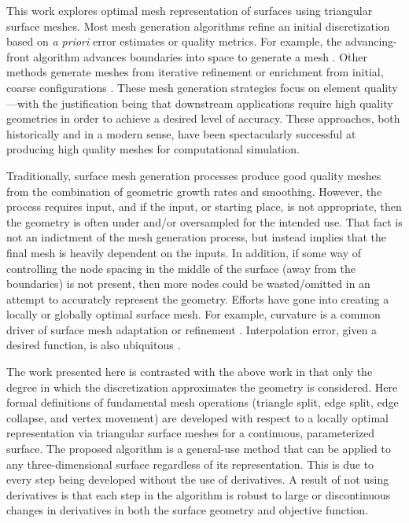 This work explores optimal mesh representation of surfaces using 
triangular surface meshes.
Most mesh generation algorithms refine an initial discretization based
on {\it a priori} error estimates or quality metrics. For example, the
advancing-front algorithm advances boundaries into space to generate a
mesh \cite{tristrano98,diaz-morcillo98}. Other methods generate
meshes from iterative refinement or enrichment from initial, coarse
configurations \cite{marcum98,marcum00,shewchuk02}. These mesh
generation strategies focus on element quality---with the
justification being that downstream applications require high quality
geometries in order to achieve a desired level of accuracy. These
approaches, both historically and in a modern sense, have been 
spectacularly successful at producing high quality meshes for 
computational simulation.

Traditionally, surface mesh generation processes produce good quality
meshes from the combination of geometric growth rates and smoothing.
However, the process requires input, and if the input, or starting place,
is not appropriate, then the geometry is often under and/or oversampled
for the intended use. That fact is not an indictment of the mesh
generation process, but instead implies that the final mesh is heavily
dependent on the inputs. In addition, if some way of controlling the
node spacing in the middle of the surface (away from the boundaries) is
not present, then more nodes could be wasted/omitted in an attempt to
accurately represent the geometry. Efforts have gone into
creating a locally or globally optimal surface mesh. For example,
curvature is a common driver of surface mesh adaptation or refinement
\cite{siqueria13}. Interpolation error, given a desired function, 
is also ubiquitous \cite{peraire87,alauzet06,buscaglia97,huang05}.

The work presented here is contrasted with the above work in that only
the degree in which the discretization approximates the geometry is
considered.  Here formal definitions of fundamental mesh operations
(triangle split, edge split, edge collapse, and vertex movement) are
developed with respect to a locally optimal representation via
triangular surface meshes for a continuous, parameterized surface. The
proposed algorithm is a general-use method that can be applied to any
three-dimensional surface regardless of its representation.  This is due
to every step being developed without the use of derivatives. A result
of not using derivatives is that each step in the algorithm is robust to
large or discontinuous changes in derivatives in both the surface
geometry and objective function.

